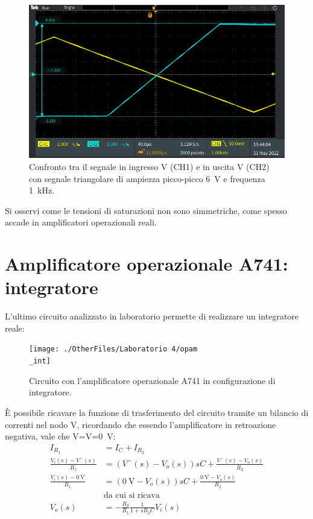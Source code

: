 \begin{figure}[h!]
	\centering
	\includegraphics[width=0.7\linewidth]{./ImageFiles/Laboratorio 4/TEK00015}
	\caption{Confronto tra il segnale in ingresso V (CH1)  e in uscita V (CH2) con segnale triangolare di ampiezza picco-picco \SI{6}{\volt} e frequenza \SI{1}{\kilo\hertz}.}
	\label{fig:opamp_inv_sat_tri}
\end{figure}

\noindent
Si osservi come le tensioni di saturazioni non sono simmetriche, come spesso accade in amplificatori operazionali reali.

\clearpage
\section{Amplificatore operazionale \textmu A741: integratore}

L'ultimo circuito analizzato in laboratorio permette di realizzare un integratore reale:
\begin{figure}[h!]
	\centering
	\texttt{[image: ./OtherFiles/Laboratorio 4/opam\\\_int]}
	\caption{Circuito con l'amplificatore operazionale \textmu A741 in configurazione di integratore.}
	\label{fig:opamp_int}
\end{figure}

\noindent
\`E possibile ricavare la funzione di trasferimento del circuito tramite un bilancio di correnti nel nodo V\super{-}, ricordando che essendo l'amplificatore in retroazione negativa, vale che V\super{+}=V\super{-}=\SI{0}{\volt}:
\begin{equation}
	\begin{split}
		I_{R_1}&=I_{C}+I_{R_2} \\
		\frac{V_i(s)-V^-(s)}{R_1}&=(V^-(s)-V_o(s))sC+\frac{V^-(s)-V_o(s)}{R_2} \\
		\frac{V_i(s)-\SI{0}{\volt}}{R_1}&=(\SI{0}{\volt}-V_o(s))sC+\frac{\SI{0}{\volt}-V_o(s)}{R_2} \\
		&\text{da cui si ricava} \\
		V_o(s)&=-\frac{R_2}{R_1}\frac{1}{1+sR_2C}V_i(s)
	\end{split}
\end{equation}


